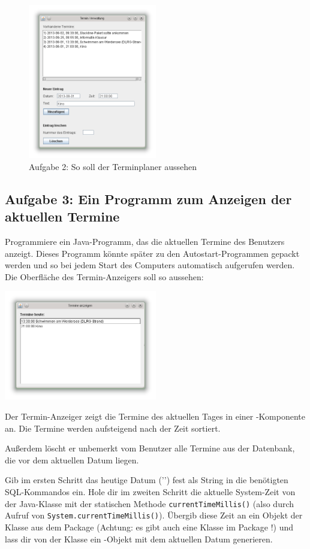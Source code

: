 \begin{figure}[h]
\centering
\includegraphics[width=0.5\textwidth]{./inf/SEKII/37_JavaSQL_Datenbankzugriffe/TermineAufgabe2.png}
\caption{Aufgabe 2: So soll der Terminplaner aussehen}
\label{fig:terminplaner}
\end{figure}


\subsection{Aufgabe 3: Ein Programm zum Anzeigen der aktuellen Termine}

Programmiere ein Java-Programm, das die aktuellen Termine des Benutzers anzeigt.
Dieses Programm könnte später zu den Autostart-Programmen gepackt werden und so
bei jedem Start des Computers automatisch aufgerufen werden. Die Oberfläche des
Termin-Anzeigers soll so aussehen:

\begin{center}
\includegraphics[width=0.5\textwidth]{./inf/SEKII/37_JavaSQL_Datenbankzugriffe/TermineAufgabe3.png}
\end{center}

Der Termin-Anzeiger zeigt die Termine des aktuellen Tages in einer
-Komponente an. Die Termine werden aufsteigend nach der Zeit
sortiert. 

Außerdem löscht er unbemerkt vom Benutzer alle Termine aus der Datenbank, die
vor dem aktuellen Datum liegen.

Gib im ersten Schritt das heutige Datum (’\todayI’) fest als String in die
benötigten SQL-Kommandos ein. Hole dir im zweiten Schritt die aktuelle
System-Zeit von der Java-Klasse  mit der statischen Methode
\lstinline|currentTimeMillis()| (also durch Aufruf von
\lstinline|System.currentTimeMillis()|). Übergib diese Zeit an ein Objekt der
Klasse  aus dem Package  (Achtung: es gibt
auch eine Klasse  im Package !) und lass dir
von der Klasse  ein -Objekt mit dem aktuellen Datum
generieren.
